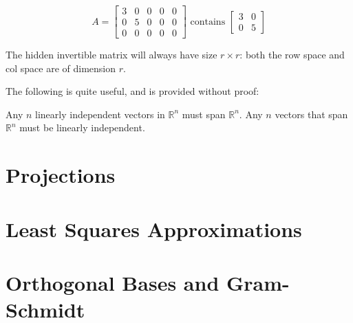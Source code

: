 \documentclass{article}
\begin{document}
\begin{example}
    \[A =
    \begin{bmatrix}
        3& 0& 0& 0& 0 \\
        0& 5& 0& 0& 0 \\
        0& 0& 0& 0& 0   
    \end{bmatrix}
    \textrm{ contains }
    \begin{bmatrix}
        3& 0 \\
        0& 5
    \end{bmatrix}
    \]

    The hidden invertible matrix will always have size $r \times r$: both the row space and col space are of dimension $r$.
\end{example}

The following is quite useful, and is provided without proof:
\begin{theorem}
    Any $n$ linearly independent vectors in $\mathbb{R}^n$ must span $\mathbb{R}^n$.
    Any $n$ vectors that span $\mathbb{R}^n$ must be linearly independent.
\end{theorem}

\section{Projections}

\section{Least Squares Approximations}

\section{Orthogonal Bases and Gram-Schmidt}
\cite{ctan}

\newpage

\nocite{*}


\end{document}
